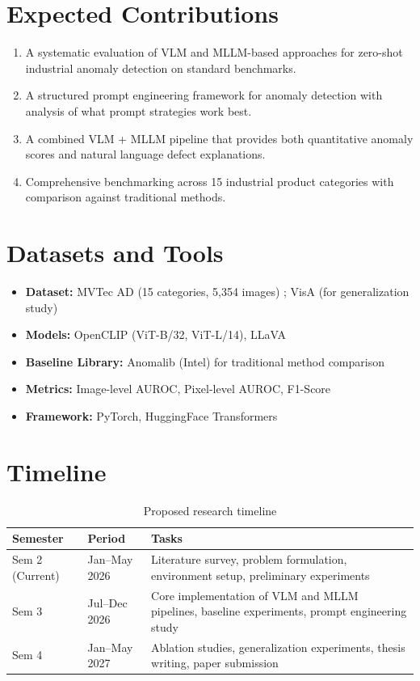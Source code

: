 \documentclass[12pt, a4paper]{article}
\begin{document}
\section{Expected Contributions}

\begin{enumerate}[leftmargin=*]
    \item A systematic evaluation of VLM and MLLM-based approaches for zero-shot industrial anomaly detection on standard benchmarks.
    \item A structured prompt engineering framework for anomaly detection with analysis of what prompt strategies work best.
    \item A combined VLM + MLLM pipeline that provides both quantitative anomaly scores and natural language defect explanations.
    \item Comprehensive benchmarking across 15 industrial product categories with comparison against traditional methods.
\end{enumerate}

\section{Datasets and Tools}

\begin{itemize}[leftmargin=*]
    \item \textbf{Dataset:} MVTec AD (15 categories, 5,354 images) \cite{bergmann2019mvtec}; VisA (for generalization study)
    \item \textbf{Models:} OpenCLIP (ViT-B/32, ViT-L/14), LLaVA
    \item \textbf{Baseline Library:} Anomalib (Intel) for traditional method comparison
    \item \textbf{Metrics:} Image-level AUROC, Pixel-level AUROC, F1-Score
    \item \textbf{Framework:} PyTorch, HuggingFace Transformers
\end{itemize}

\section{Timeline}

\begin{table}[h]
\centering
\begin{tabular}{@{}llp{8cm}@{}}
\toprule
\textbf{Semester} & \textbf{Period} & \textbf{Tasks} \\
\midrule
Sem 2 (Current) & Jan--May 2026 & Literature survey, problem formulation, environment setup, preliminary experiments \\
\addlinespace
Sem 3 & Jul--Dec 2026 & Core implementation of VLM and MLLM pipelines, baseline experiments, prompt engineering study \\
\addlinespace
Sem 4 & Jan--May 2027 & Ablation studies, generalization experiments, thesis writing, paper submission \\
\bottomrule
\end{tabular}
\caption{Proposed research timeline}
\end{table}
\end{document}
